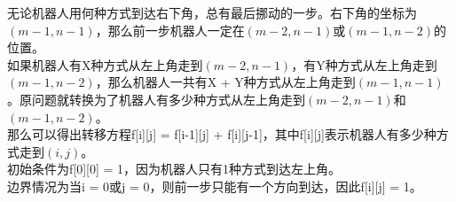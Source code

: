 \begin{table}[H]
	\centering
	\caption{终点}
\end{table}

无论机器人用何种方式到达右下角，总有最后挪动的一步。右下角的坐标为$ (m-1, n-1) $，那么前一步机器人一定在$ (m-2, n-1) $或$ (m-1, n-2) $的位置。 \\

如果机器人有X种方式从左上角走到$ (m-2, n-1) $，有Y种方式从左上角走到$ (m-1, n-2) $，那么机器人一共有X + Y种方式从左上角走到$ (m-1, n-1) $。原问题就转换为了机器人有多少种方式从左上角走到$ (m-2, n-1) $和$ (m-1, n-2) $。 \\

那么可以得出转移方程f[i][j] = f[i-1][j] + f[i][j-1]，其中f[i][j]表示机器人有多少种方式走到$ (i, j) $。 \\

初始条件为f[0][0] = 1，因为机器人只有1种方式到达左上角。 \\

边界情况为当i = 0或j = 0，则前一步只能有一个方向到达，因此f[i][j] = 1。 \\

